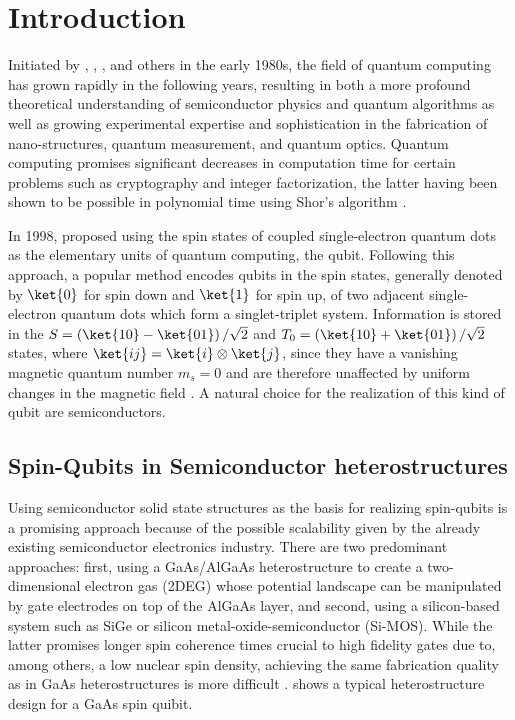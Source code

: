 \chapter{Introduction}
Initiated by \citet{Benioff1980}, \citet{Feynman1982}, \citet{Deutsch97}, and others in the early 1980s, the field of quantum computing has grown rapidly in the following years, resulting in both a more profound theoretical understanding of semiconductor physics and quantum algorithms as well as growing experimental expertise and sophistication in the fabrication of nano-structures, quantum measurement, and quantum optics. Quantum computing promises significant decreases in computation time for certain problems such as cryptography and integer factorization, the latter having been shown to be possible in polynomial time using Shor's algorithm \cite{Shor1999}.

In 1998, \citet{Loss1998} proposed using the spin states of coupled single-electron quantum dots as the elementary units of quantum computing, the qubit. Following this approach, a popular method encodes qubits in the spin states, generally denoted by $\ket{0}$ for spin down and $\ket{1}$ for spin up, of two adjacent single-electron quantum dots which form a singlet-triplet system. Information is stored in the $S = \left(\ket{10}-\ket{01}\right)/\sqrt{2}$ and $T_{0} = \left(\ket{10}+\ket{01}\right)/\sqrt{2}$ states, where $\ket{ij} = \ket{i}\otimes\ket{j}$, since they have a vanishing magnetic quantum number $m_{s} = 0$ and are therefore unaffected by uniform changes in the magnetic field \cite{Petta2005}. A natural choice for the realization of this kind of qubit are semiconductors.

\section{Spin-Qubits in Semiconductor heterostructures}
Using semiconductor solid state structures as the basis for realizing spin-qubits is a promising approach because of the possible scalability given by the already existing semiconductor electronics industry. There are two predominant approaches: first, using a GaAs/AlGaAs heterostructure to create a two-dimensional electron gas (2DEG) whose potential landscape can be manipulated by gate electrodes on top of the AlGaAs layer, and second, using a silicon-based system such as SiGe or silicon metal-oxide-semiconductor (Si-MOS). While the latter promises longer spin coherence times crucial to high fidelity gates due to, among others, a low nuclear spin density, achieving the same fabrication quality as in GaAs heterostructures is more difficult \cite{DasSarma2011}.  shows a typical heterostructure design for a GaAs spin quibit.



